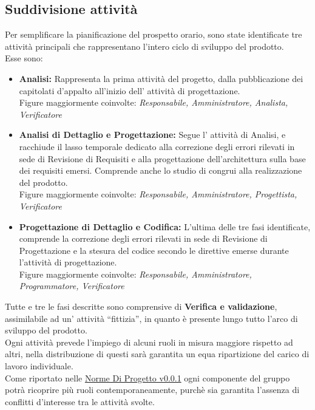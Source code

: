 \documentclass{scalatekids-article}
\begin{document}
\subsection{Suddivisione attività}
\label{sub:fasi}
Per semplificare la pianificazione del prospetto orario, sono state identificate
tre attività principali che rappresentano l'intero ciclo di sviluppo del prodotto.\\
Esse sono:
\begin{itemize}
\item\textbf{Analisi:} Rappresenta la prima attività del progetto, dalla
  pubblicazione dei capitolati d'appalto all'inizio dell' attività di progettazione.\\
  Figure maggiormente coinvolte: \textit{Responsabile, Amministratore, Analista, Verificatore}
\item\textbf{Analisi di Dettaglio e Progettazione:} Segue l' attività di Analisi, e
  racchiude il lasso temporale dedicato alla correzione degli errori rilevati in
  sede di Revisione di Requisiti e alla progettazione dell'architettura sulla
  base dei requisiti emersi. Comprende anche lo studio di 
  congrui alla realizzazione del prodotto.\\ Figure maggiormente coinvolte:
  \textit{Responsabile, Amministratore, Progettista, Verificatore}
\item\textbf{Progettazione di Dettaglio e Codifica:} L'ultima delle tre fasi
  identificate, comprende la correzione degli errori rilevati in sede di
  Revisione di Progettazione e la stesura del codice secondo le direttive emerse
  durante l'attività di progettazione.\\ Figure maggiormente coinvolte:
  \textit{Responsabile, Amministratore, Programmatore, Verificatore}
\end{itemize}
Tutte e tre le fasi descritte sono comprensive di \textbf{Verifica e
  validazione}, assimilabile ad un' attività ``fittizia'', in quanto è
presente lungo tutto l'arco di sviluppo del prodotto.\\
Ogni attività prevede l'impiego di alcuni ruoli in misura maggiore rispetto ad
altri, nella distribuzione di questi sarà garantita un equa ripartizione del
carico di lavoro individuale.\\
Come riportato nelle \href{run:../Interni/NormeDiProgetto\_v0.0.1.pdf}{Norme Di Progetto v0.0.1}
ogni componente del gruppo potrà ricoprire più ruoli contemporaneamente, purchè sia
garantita l'assenza di conflitti d'interesse tra le attività svolte.
\newpage
\end{document}
